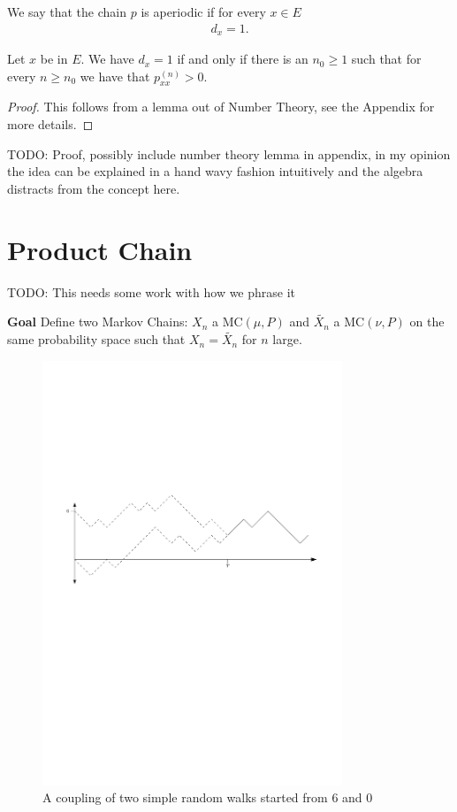\begin{defn}
	We say that the chain $p$ is aperiodic if for every $x \in E$
	\begin{align}
	\boxed{d_x=1}.
	\end{align}
\end{defn}

\begin{prop}[]
	Let $x$ be in $E$. We have $d_x=1$ if and only if there is an $n_0 \geq 1$ such that for every $n \geq n_0$ we have that $ p_{xx}^{(n)}>0$.
\end{prop}
\begin{proof}
	This follows from a lemma out of Number Theory, see the Appendix for more details.
\end{proof}

TODO: Proof, possibly include number theory lemma in appendix, in my opinion the idea can be explained in a hand wavy fashion intuitively and the algebra distracts from the concept here.

\section{Product Chain}
TODO: This needs some work with how we phrase it

\textbf{Goal} Define two Markov Chains: $X_n$ a MC$(\mu, P)$ and $\tilde{X_n}$ a MC$(\nu, P) $ on the same probability space such that $X_n = \tilde{X_n}$ for $n$ large.

\begin{figure}[h!]
	\centering
	\includegraphics[width=0.8\textwidth]{figures/coupling.pdf}
	\caption{A coupling of two simple random walks started from $6$ and $0$}
\end{figure}


